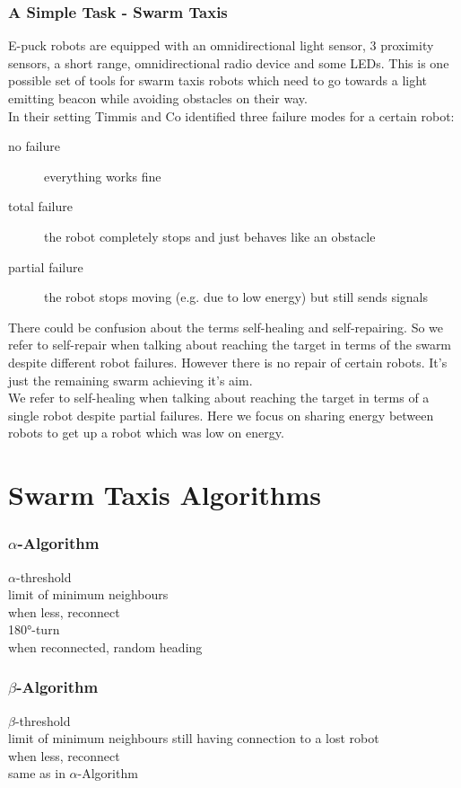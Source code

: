 \documentclass[
	a4paper,
	article,
	pagesize,
	pdftex,
	12pt,
	english,
	fleqn,
	final,
	]{scrartcl}
\begin{document}
\subsubsection{A Simple Task - Swarm Taxis}
E-puck robots are equipped with an omnidirectional light sensor, 3 proximity sensors, a short range, omnidirectional radio device and some LEDs.
This is one possible set of tools for swarm taxis robots which need to go towards a light emitting beacon while avoiding obstacles on their way.\\

In their setting Timmis and Co identified three failure modes for a certain robot:
\begin{description}
	\item[no failure]
		everything works fine
	\item[total failure] the robot completely stops and just behaves like an obstacle
	\item[partial failure] the robot stops moving (e.g. due to low energy) but still sends signals
\end{description} 

There could be confusion about the terms self-healing and self-repairing.
So we refer to self-repair when talking about reaching the target
in terms of the swarm despite different robot failures. However there is no repair of certain robots. It's just the remaining swarm achieving it's aim.\\
We refer to self-healing when talking about reaching the target
in terms of a single robot despite partial failures. 
Here we focus on sharing energy between robots to get up a robot which was low on energy.

\section{Swarm Taxis Algorithms}

\subsubsection{$\alpha$-Algorithm}
$\alpha$-threshold\\
limit of minimum neighbours\\
when less, reconnect\\
180°-turn\\
when reconnected, random heading

\subsubsection{$\beta$-Algorithm}
$\beta$-threshold\\
limit of minimum neighbours still having connection to a lost robot\\
when less, reconnect\\
same as in $\alpha$-Algorithm
\end{document}
